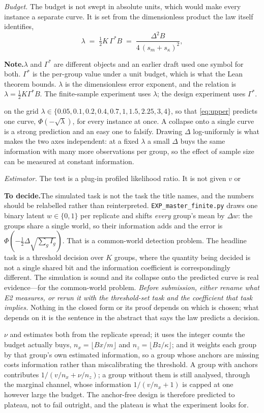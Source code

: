 \documentclass[conference]{IEEEtran}
\theoremstyle{definition}
\newif\ifshownotes\shownotestrue
\newcommand{\NOTEPAR}[1]{\ifshownotes\par\vspace{2pt}\noindent%
  {\color{notecol}\textsf{\footnotesize\textbf{Note.}\;#1}}\par\vspace{2pt}\fi}
\newcommand{\TODOPAR}[1]{\ifshownotes\par\vspace{2pt}\noindent%
  {\color{todocol}\textsf{\footnotesize\textbf{To decide.}\;#1}}\par\vspace{2pt}\fi}
\begin{document}
\emph{Budget.} The budget is not swept in absolute units, which would make every instance
a separate curve. It is set from the dimensionless product the law itself identifies,
\begin{equation}
\lambda \;=\; \tfrac12 K\,\Gamma^{*}B \;=\; \frac{\Delta^{2}B}{4\,(s_{m}+s_{\kappa})^{2}},
\label{eq:lambda}
\end{equation}
\NOTEPAR{$\lambda$ and $\Gamma^{*}$ are different objects and an earlier draft used one
symbol for both. $\Gamma^{*}$ is the per-group value under a unit budget, which is what the
Lean theorem bounds. $\lambda$ is the dimensionless error exponent, and the relation is
$\lambda=\tfrac12K\Gamma^{*}B$. The finite-sample experiment uses $\lambda$; the design
experiment uses $\Gamma^{*}$.}
on the grid $\lambda\in\{0.05,0.1,0.2,0.4,0.7,1,1.5,2.25,3,4\}$, so that
\eqref{eq:upper} predicts one curve, $\Phi(-\sqrt{\lambda})$, for every instance at once.
A collapse onto a single curve is a strong prediction and an easy one to falsify. Drawing
$\Delta$ log-uniformly is what makes the two axes independent: at a fixed $\lambda$ a small
$\Delta$ buys the same information with many more observations per group, so the effect of
sample size can be measured at constant information.

\emph{Estimator.} The test is a plug-in profiled likelihood ratio. It is not given $v$ or
\TODOPAR{The simulated task is not the task the title names, and the numbers should be
relabelled rather than reinterpreted. \texttt{EXP\_master\_finite.py} draws one binary latent
$w\in\{0,1\}$ per replicate and shifts \emph{every} group's mean by $\Delta w$: the groups
share a single world, so their information adds and the error is
$\Phi(-\tfrac12\Delta\sqrt{\sum_{g}I_{g}})$. That is a common-world detection problem. The
headline task is a threshold decision over $K$ groups, where the quantity being decided is
not a single shared bit and the information coefficient is correspondingly different. The
simulation is sound and its collapse onto the predicted curve is real evidence---for the
common-world problem. \emph{Before submission, either rename what E2 measures, or rerun it
with the threshold-set task and the coefficient that task implies.} Nothing in the closed form
or its proof depends on which is chosen; what depends on it is the sentence in the abstract
that says the law predicts a decision.}
$\nu$ and estimates both from the replicate spread; it uses the integer counts the budget
actually buys, $n_{x}=\lfloor Bx/m\rfloor$ and $n_{z}=\lfloor Bz/\kappa\rfloor$; and it
weights each group by that group's own estimated information, so a group whose anchors are
missing costs information rather than miscalibrating the threshold. A group with anchors
contributes $1/(v/n_{x}+\nu/n_{z})$; a group without them is still analysed, through the
marginal channel, whose information $1/(v/n_{x}+1)$ is capped at one however large the
budget. The anchor-free design is therefore predicted to plateau, not to fail outright, and
the plateau is what the experiment looks for.
\end{document}
